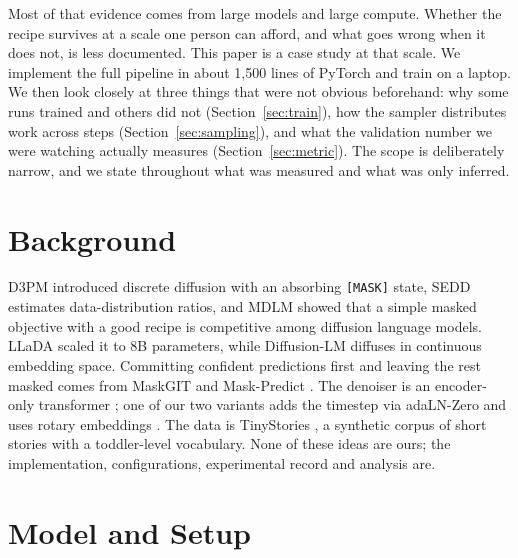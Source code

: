 \documentclass[conference]{IEEEtran}
\newcommand{\mask}{\texttt{[MASK]}}
\begin{document}
Most of that evidence comes from large models and large compute. Whether the
recipe survives at a scale one person can afford, and what goes wrong when it
does not, is less documented. This paper is a case study at that scale. We
implement the full pipeline in about 1,500 lines of PyTorch and train on a
laptop. We then look closely at three things that were not obvious beforehand:
why some runs trained and others did not (Section~\ref{sec:train}), how the
sampler distributes work across steps (Section~\ref{sec:sampling}), and what
the validation number we were watching actually measures
(Section~\ref{sec:metric}). The scope is deliberately narrow, and we state
throughout what was measured and what was only inferred.

\section{Background}

D3PM \cite{austin2021d3pm} introduced discrete diffusion with an absorbing
\mask{} state, SEDD \cite{lou2024sedd} estimates data-distribution ratios, and
MDLM \cite{sahoo2024mdlm} showed that a simple masked objective with a good
recipe is competitive among diffusion language models. LLaDA
\cite{nie2025llada} scaled it to 8B parameters, while Diffusion-LM
\cite{li2022diffusionlm} diffuses in continuous embedding space. Committing
confident predictions first and leaving the rest masked comes from MaskGIT
\cite{chang2022maskgit} and Mask-Predict \cite{ghazvininejad2019maskpredict}.
The denoiser is an encoder-only transformer
\cite{vaswani2017attention,devlin2019bert}; one of our two variants adds the
timestep via adaLN-Zero \cite{peebles2023dit} and uses rotary embeddings
\cite{su2021roformer}. The data is TinyStories \cite{eldan2023tinystories}, a
synthetic corpus of short stories with a toddler-level vocabulary. None of
these ideas are ours; the implementation, configurations, experimental record
and analysis are.

\section{Model and Setup}
\end{document}
